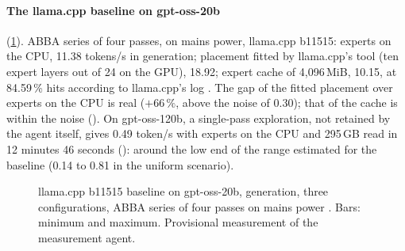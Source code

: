 \paragraph{The llama.cpp baseline on gpt-oss-20b} (\cref{fig:base-20b}). ABBA series of four passes, on mains power, llama.cpp b11515: experts on the CPU, 11.38 tokens/s in generation; placement fitted by llama.cpp's tool (ten expert layers out of 24 on the GPU), 18.92; expert cache of 4{,}096\,MiB, 10.15, at 84.59\,\% hits according to llama.cpp's log \mes. The gap of the fitted placement over experts on the CPU is real ($+66\,\%$, above the noise of 0.30); that of the cache is within the noise (). On gpt-oss-120b, a single-pass exploration, not retained by the agent itself, gives 0.49 token/s with experts on the CPU and 295\,GB read in 12 minutes 46 seconds (): around the low end of the range estimated for the baseline (0.14 to 0.81 in the uniform scenario).

\begin{figure}[ht]
\centering
\GrapheBaseVingt
\caption[llama.cpp baseline on gpt-oss-20b]{llama.cpp b11515 baseline on gpt-oss-20b, generation, three configurations, ABBA series of four passes on mains power \mes. Bars: minimum and maximum. Provisional measurement of the measurement agent.}
\label{fig:base-20b}
\end{figure}

